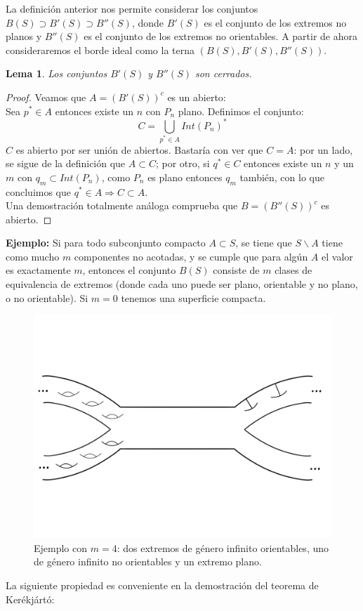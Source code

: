 \documentclass[a4paper,11pt,spanish, twoside, leqno]{tfg-uam}
\newtheorem{lema}[teor]{Lema}
\theoremstyle{definition}
\begin{document}
La definición anterior nos permite considerar los conjuntos $B(S) \supset B'(S) \supset B''(S)$, donde $B'(S)$  es el conjunto de los extremos no planos y $B''(S)$ es el conjunto de los extremos no orientables. A partir de ahora consideraremos el borde ideal como la terna $(B(S), B'(S), B''(S))$.
\begin{lema}
Los conjuntos $B'(S)$ y $B''(S)$ son cerrados. 
\end{lema}
\begin{proof}
Veamos que $A = (B'(S))^c$ es un abierto:\\
Sea $p^* \in A$ entonces existe un $n$ con $P_n$ plano. Definimos el conjunto:
\[
C = \bigcup_{p^* \in A} Int(P_n)^*
\]
$C$ es abierto por ser unión de abiertos. Bastaría con ver que $C=A$: por un lado, se sigue de la definición que $A\subset C$; por otro, si $q^* \in C$ entonces existe un $n$ y un $m$ con $q_m \subset Int(P_n)$, como $P_n$ es plano entonces $q_m$ también, con lo que concluimos que $q^* \in A \Rightarrow C\subset A$.\\
Una demostración totalmente análoga comprueba que $B = (B''(S))^c$ es abierto.
\end{proof}
\noindent \textbf{Ejemplo:} Si para todo subconjunto compacto $A\subset S$, se tiene que $S\backslash A$ tiene como mucho $m$ componentes no acotadas, y se cumple que para algún $A$ el valor es exactamente $m$, entonces el conjunto $B(S)$ consiste de $m$ clases de equivalencia de extremos (donde cada uno puede ser plano, orientable y no plano, o no orientable). Si $m=0$ tenemos una superficie compacta.


\begin{figure}[h!]
	\centering
	\includegraphics[width=0.5\linewidth]{imagenes/m4.png}
	\caption{Ejemplo con $m=4$: dos extremos de género infinito orientables, uno de género infinito no orientables y un extremo plano.}
	\label{fig:m4}
\end{figure}

La siguiente propiedad es conveniente en la demostración del teorema de Kerékjártó:
\end{document}
